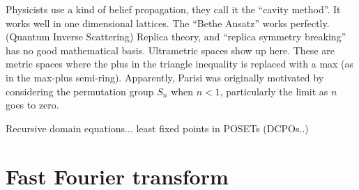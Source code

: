 \documentclass[11pt]{article}
\begin{document}
Physicists use a kind of belief propagation, they call it the ``cavity method''. 
It works well in one dimensional lattices. The ``Bethe Ansatz'' works perfectly.
(Quantum Inverse Scattering)
Replica theory, and ``replica symmetry breaking'' has no good mathematical basis.
Ultrametric spaces show up here. These are metric spaces where
the plus in the triangle inequality is replaced with a max (as in the max-plus semi-ring).
Apparently, Parisi was originally motivated by considering
the permutation group $S_n$ when $n<1$, particularly the limit as $n$ goes to zero.

Recursive domain equations... least fixed points in POSETs (DCPOs..)


%
%

\section{Fast Fourier transform}

\end{document}
